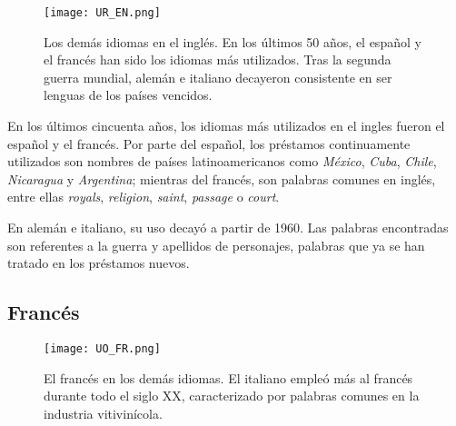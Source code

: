 \begin{figure}%
	\centering
	\texttt{[image: UR\_EN.png]}
	\label{fig.ST_b_EN}
	\caption{Los demás idiomas en el inglés. En los últimos 50 años, el español y el francés han sido los idiomas más utilizados. Tras la segunda guerra mundial, alemán e italiano decayeron consistente en ser lenguas de los países vencidos.}
\end{figure} 


En los últimos cincuenta años, los idiomas más utilizados  en el ingles fueron el español y el francés. Por parte del español, los préstamos continuamente utilizados son nombres de países latinoamericanos como \textit{México}, \textit{Cuba}, \textit{Chile}, \textit{Nicaragua} y \textit{Argentina};   mientras del francés, son palabras comunes en  inglés, entre ellas \textit{royals}, \textit{religion}, \textit{saint}, \textit{passage} o \textit{court}.

En alemán e italiano, su uso decayó a partir de 1960. Las palabras encontradas son referentes a la guerra y apellidos de personajes, palabras que ya se han tratado en los préstamos nuevos.




 





\subsection{Francés} %

\begin{figure}%
	\centering
	\texttt{[image: UO\_FR.png]}
	\label{fig.ST_a_FR}
	\caption{El francés en los demás idiomas. El italiano empleó más al francés durante todo el siglo XX, caracterizado por palabras comunes en la industria vitivinícola.}
\end{figure}


